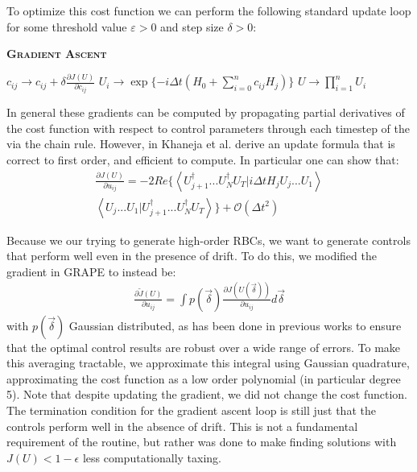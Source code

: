 \documentclass[aps,nofootinbib,pra,notitlepage,twocolumn]{revtex4-1}
\newcommand{\braket}[2]{\left\langle #1 | #2 \right\rangle}
\begin{document}
To optimize this cost function we can perform the following standard update loop for some threshold value $\varepsilon > 0$ and step size $\delta > 0$:
\begin{algorithm}[H]
  \caption{\textsc{\textbf{Gradient Ascent}}}
  \begin{algorithmic}
    \State $c_{ij} \rightarrow c_{ij} + \delta\frac{\partial J(U)}{\partial c_{ij}}$
    \State $U_i \rightarrow \exp\{-i\Delta t(H_0 + \sum_{i=0}^{n}c_{ij}H_j)\}$
    \EndFor
    \State $U \rightarrow \prod_{i=1}^nU_i$
    \EndWhile
  \end{algorithmic}
\end{algorithm}

In general these gradients can be computed by propagating partial derivatives of the cost function with respect to control parameters through each timestep of the  via the chain rule. However, in \cite{Khaneja2005} Khaneja et al. derive an update formula that is correct to first order, and efficient to compute. In particular one can show that:
\begin{equation}\label{eq:update}
  \begin{split}
\frac{\partial J(U)}{\partial u_{ij}} = -2Re\{\braket{{U_{j+1}^{\dagger}...U_N^{\dagger} U_T}}{i\Delta tH_jU_j...U_1}\\
\braket{U_j...U_1}{U_{j+1}^{\dagger}...U_N^{\dagger} U_T}\} +  \mathcal{O}(\Delta t^2)
  \end{split}
\end{equation}

Because we our trying to generate high-order RBCs, we want to generate controls that perform well even in the presence of drift. To do this, we modified the gradient in GRAPE to instead be:
\begin{align}\label{eq:quadrature}
\frac{\partial \tilde J(U)}{\partial u_{ij}} =
\int p(\vec{\delta})\frac{\partial J(U(\vec{\delta}))}{\partial u_{ij}} d\vec{\delta}
\end{align}
with $p(\vec{\delta})$ Gaussian distributed, as has been done in previous works \cite{Goerz2014} to ensure that the optimal control results are robust over a wide range of errors. To make this averaging tractable, we approximate this integral using Gaussian quadrature, approximating the cost function as a low order polynomial\cite{abramowiz1972handbook} (in particular degree 5). Note that despite updating the gradient, we did not change the cost function. The termination condition for the gradient ascent loop is still just that the controls perform well in the absence of drift. This is not a fundamental requirement of the routine, but rather was done to make finding solutions with $J(U) < 1 - \epsilon$  less computationally taxing.
\end{document}
